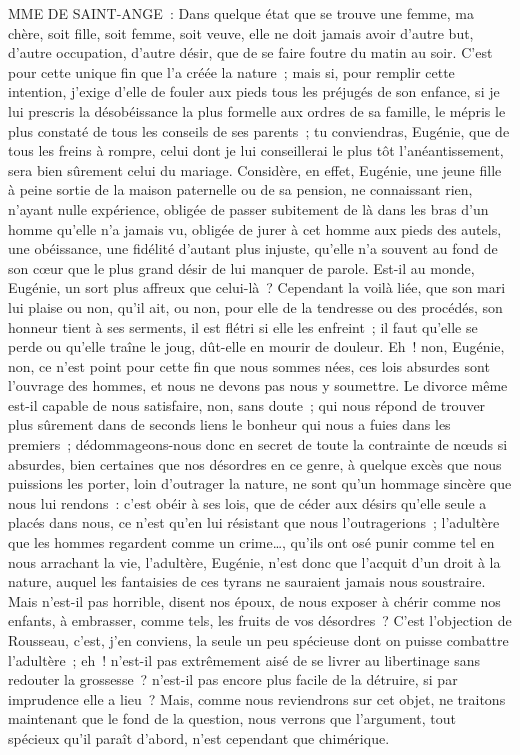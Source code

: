\documentclass[french,twoside]{book} %
\begin{document}
MME DE SAINT-ANGE : Dans quelque état que se trouve une femme, ma chère, soit fille, soit femme, soit veuve, elle ne doit jamais avoir d’autre but, d’autre occupation, d’autre désir, que de se faire foutre du matin au soir. C’est pour cette unique fin que l’a créée la nature ; mais si, pour remplir cette intention, j’exige d’elle de fouler aux pieds tous les préjugés de son enfance, si je lui prescris la désobéissance la plus formelle aux ordres de sa famille, le mépris le plus constaté de tous les conseils de ses parents ; tu conviendras, Eugénie, que de tous les freins à rompre, celui dont je lui conseillerai le plus tôt l’anéantissement, sera bien sûrement celui du mariage. Considère, en effet, Eugénie, une jeune fille à peine sortie de la maison paternelle ou de sa pension, ne connaissant rien, n’ayant nulle expérience, obligée de passer subitement de là dans les bras d’un homme qu’elle n’a jamais vu, obligée de jurer à cet homme aux pieds des autels, une obéissance, une fidélité d’autant plus injuste, qu’elle n’a souvent au fond de son cœur que le plus grand désir de lui manquer de parole. Est-il au monde, Eugénie, un sort plus affreux que celui-là ? Cependant la voilà liée, que son mari lui plaise ou non, qu’il ait, ou non, pour elle de la tendresse ou des procédés, son honneur tient à ses serments, il est flétri si elle les enfreint ; il faut qu’elle se perde ou qu’elle traîne le joug, dût-elle en mourir de douleur. Eh ! non, Eugénie, non, ce n’est point pour cette fin que nous sommes nées, ces lois absurdes sont l’ouvrage des hommes, et nous ne devons pas nous y soumettre. Le divorce même est-il capable de nous satisfaire, non, sans doute ; qui nous répond de trouver plus sûrement dans de seconds liens le bonheur qui nous a fuies dans les premiers ; dédommageons-nous donc en secret de toute la contrainte de nœuds si absurdes, bien certaines que nos désordres en ce genre, à quelque excès que nous puissions les porter, loin d’outrager la nature, ne sont qu’un hommage sincère que nous lui rendons : c’est obéir à ses lois, que de céder aux désirs qu’elle seule a placés dans nous, ce n’est qu’en lui résistant que nous l’outragerions ; l’adultère que les hommes regardent comme un crime…, qu’ils ont osé punir comme tel en nous arrachant la vie, l’adultère, Eugénie, n’est donc que l’acquit d’un droit à la nature, auquel les fantaisies de ces tyrans ne sauraient jamais nous soustraire. Mais n’est-il pas horrible, disent nos époux, de nous exposer à chérir comme nos enfants, à embrasser, comme tels, les fruits de vos désordres ? C’est l’objection de Rousseau, c’est, j’en conviens, la seule un peu spécieuse dont on puisse combattre l’adultère ; eh ! n’est-il pas extrêmement aisé de se livrer au libertinage sans redouter la grossesse ? n’est-il pas encore plus facile de la détruire, si par imprudence elle a lieu ? Mais, comme nous reviendrons sur cet objet, ne traitons maintenant que le fond de la question, nous verrons que l’argument, tout spécieux qu’il paraît d’abord, n’est cependant que chimérique.\par
\end{document}
